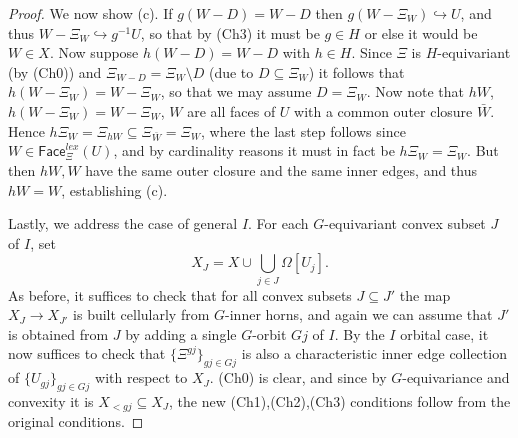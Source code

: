 \documentclass[a4paper,10pt,draft]{article}%
\begin{document}
\begin{proof}

We now show (c).
If $g(W-D)=W-D$ then $g(W - \Xi_W) \hookrightarrow U$,
and thus $W - \Xi_W \hookrightarrow g^{-1}U$,
so that by (Ch3) it must be $g \in H$ or else it would be $W \in X$.
Now suppose $h(W-D)=W-D$ with $h\in H$.
Since $\Xi$ is $H$-equivariant (by (Ch0)) and
$\Xi_{W-D} = \Xi_{W} \setminus D$ (due to $D \subseteq \Xi_{W}$) it follows that 
$h(W-\Xi_W)=W-\Xi_W$,
so that we may assume $D=\Xi_W$.
Now note that
$hW$, $h(W-\Xi_W)=W-\Xi_W$, $W$
are all faces of $U$ with a common outer closure $\bar{W}$.
Hence
$h\Xi_{W} = \Xi_{hW} \subseteq \Xi_{\bar{W}} = \Xi_{W}$, where the last step follows since
$W \in \mathsf{Face}_{\Xi}^{lex}(U)$, and by cardinality reasons it must in fact be $h \Xi_{W} = \Xi_{W}$. But then $hW,W$
have the same outer closure and the same inner edges, and thus 
$hW=W$, establishing (c).


Lastly, we address the case of general $I$.
For each $G$-equivariant convex subset $J$ of $I$, set
\[
	X_J = 
	X \cup \bigcup_{j \in J} \Omega[U_j].
\]
As before, it suffices to check that for all convex subsets
$J \subseteq J'$
the map $X_J \to X_{J'}$ is built cellularly from $G$-inner horns,
and again we can assume that $J'$ is obtained from $J$ by adding a single $G$-orbit $Gj$ of $I$.
By the $I$ orbital case, it now suffices to check that
$\{\Xi^{gj}\}_{gj \in Gj}$ is also a characteristic inner edge collection of $\{U_{g j}\}_{g j \in Gj}$ with respect to $X_J$.
(Ch0) is clear, and since by $G$-equivariance and convexity it is $X_{<gj} \subseteq X_J$,
the new (Ch1),(Ch2),(Ch3)
conditions follow from the original conditions.
\end{proof}
\end{document}
